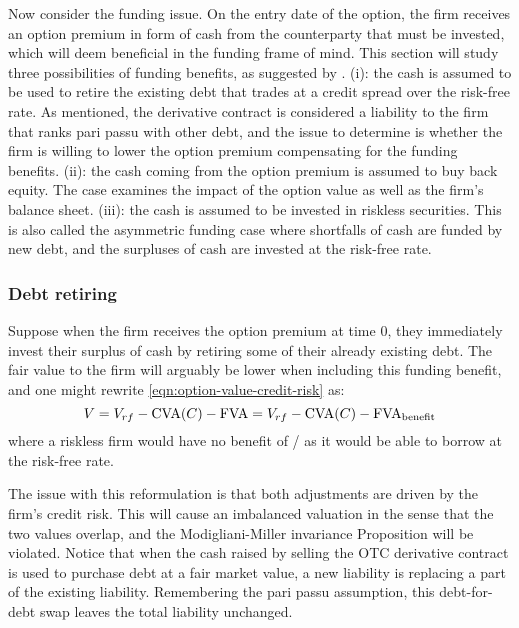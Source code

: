 \documentclass[../main.tex]{subfiles}
\begin{document}
        Now consider the funding issue. On the entry date of the option, the firm receives an option premium in form of cash from the counterparty that must be invested, which will deem beneficial in the funding frame of mind. This section will study three possibilities of funding benefits, as suggested by \cite{Hillion2016}. (i): the cash is assumed to be used to retire the existing debt that trades at a credit spread over the risk-free rate. As mentioned, the derivative contract is considered a liability to the firm that ranks pari passu with other debt, and the issue to determine is whether the firm is willing to lower the option premium compensating for the funding benefits. (ii): the cash coming from the option premium is assumed to buy back equity. The case examines the impact of the option value as well as the firm's balance sheet. (iii): the cash is assumed to be invested in riskless securities. This is also called the asymmetric funding case where shortfalls of cash are funded by new debt, and the surpluses of cash are invested at the risk-free rate.

        \subsubsection{Debt retiring}
            Suppose when the firm receives the option premium at time 0, they immediately invest their surplus of cash by retiring some of their already existing debt. The fair value to the firm will arguably be lower when including this funding benefit, and one might rewrite \cref{eqn:option-value-credit-risk} as:
            \begin{equation}
                V = V_{rf} - \text{\CVA/}(C) - \text{\FVA/} = V_{rf} - \text{\CVA/}(C) - \text{\FVA/}_{\text{benefit}}
            \end{equation}
            where a riskless firm would have no benefit of \FVA/ as it would be able to borrow at the risk-free rate.
            
            The issue with this reformulation is that both adjustments are driven by the firm's credit risk. This will cause an imbalanced valuation in the sense that the two values overlap, and the Modigliani-Miller invariance Proposition will be violated. Notice that when the cash raised by selling the OTC derivative contract is used to purchase debt at a fair market value, a new liability is replacing a part of the existing liability. Remembering the pari passu assumption, this debt-for-debt swap leaves the total liability unchanged.
\end{document}
